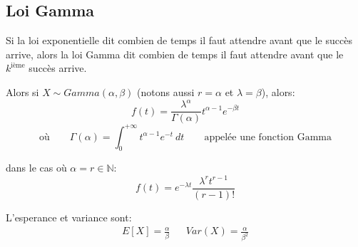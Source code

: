 \documentclass[a4paper]{article}
\newcommand{\N}{\mathbb{N}}
\begin{document}
\subsection{Loi Gamma}
Si la loi exponentielle dit combien de temps il faut attendre avant que le
succès arrive, alors la loi Gamma dit combien de temps il faut attendre avant
que le $k^{\text{ième}}$ succès arrive.

Alors si $X \sim Gamma(\alpha, \beta)$ (notons aussi $r = \alpha$ et  $\lambda = \beta$), alors:
\[
    f(t) = \frac{\lambda^{\alpha}}{\Gamma(\alpha)}t^{\alpha-1}e^{-\beta t}
\] 
\[
 \text{où} \qquad   \Gamma(\alpha) = \int_{{0}}^{{+\infty}} {t^{\alpha-1}e^{-t}} \: d{t} {} \qquad \text{appelée une fonction Gamma}
\] 

dans le cas où $\alpha = r \in \N$:
\[
    f(t) = e^{-\lambda t} \frac{\lambda^r t^{r-1}}{(r-1)!}
\] 

L'esperance et variance sont:
\begin{align*}
    E[X] = \frac{\alpha}{\beta} & & Var(X) = \frac{\alpha}{\beta^2}
\end{align*}
\end{document}
